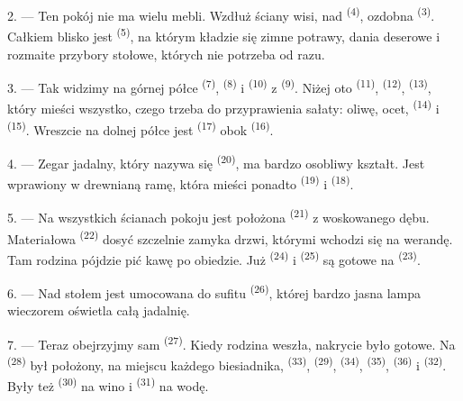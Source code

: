 2. --- Ten pokój nie ma wielu mebli. Wzdłuż ściany wisi, nad 
\textsuperscript{(4)}, ozdobna  \textsuperscript{(3)}. Całkiem blisko
jest  \textsuperscript{(5)}, na którym kładzie się zimne potrawy, dania
deserowe i rozmaite przybory stołowe, których nie potrzeba od razu.

3. --- Tak widzimy na górnej półce  \textsuperscript{(7)},
 \textsuperscript{(8)} i  \textsuperscript{(10)} z
 \textsuperscript{(9)}. Niżej oto  \textsuperscript{(11)},
 \textsuperscript{(12)},  \textsuperscript{(13)},
który mieści wszystko, czego trzeba do przyprawienia sałaty: oliwę, ocet, 
\textsuperscript{(14)} i  \textsuperscript{(15)}. Wreszcie na dolnej
półce jest  \textsuperscript{(17)} obok 
\textsuperscript{(16)}.

4. --- Zegar jadalny, który nazywa się  \textsuperscript{(20)},
ma bardzo osobliwy kształt. Jest wprawiony w drewnianą ramę, która mieści ponadto
 \textsuperscript{(19)} i  \textsuperscript{(18)}.

\VUsaut{4.6mm}
\VUsaut{3.0mm}

5. --- Na wszystkich ścianach pokoju jest położona 
\textsuperscript{(21)} z woskowanego dębu. Materiałowa 
\textsuperscript{(22)} dosyć szczelnie zamyka drzwi, którymi wchodzi się na werandę. Tam
rodzina pójdzie pić kawę po obiedzie. Już  \textsuperscript{(24)} i
 \textsuperscript{(25)} są gotowe na 
\textsuperscript{(23)}.

6. --- Nad stołem jest umocowana do sufitu 
\textsuperscript{(26)}, której bardzo jasna lampa wieczorem oświetla całą jadalnię.

7. --- Teraz obejrzyjmy sam  \textsuperscript{(27)}. Kiedy rodzina
weszła, nakrycie było gotowe. Na  \textsuperscript{(28)} był położony,
na miejscu każdego biesiadnika,  \textsuperscript{(33)},
 \textsuperscript{(29)},  \textsuperscript{(34)},
 \textsuperscript{(35)},  \textsuperscript{(36)} i
 \textsuperscript{(32)}. Były też 
\textsuperscript{(30)} na wino i  \textsuperscript{(31)} na wodę.

